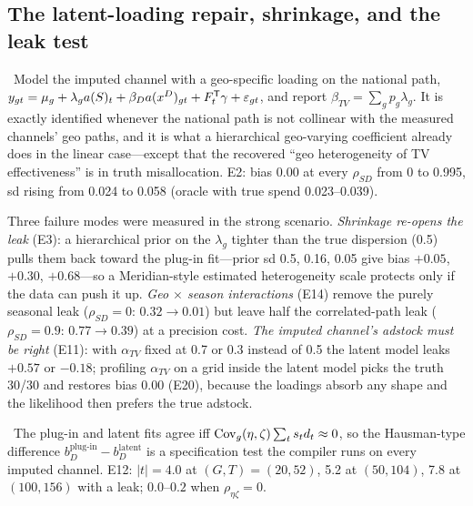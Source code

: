 \subsection{The latent-loading repair, shrinkage, and the leak test}

\begin{proposition}
\label{arch:prop:latent}
\tagEstablished\ Model the imputed channel with a geo-specific loading on the national path, $y_{gt} = \mu_g + \lambda_g a(S)_t + \beta_D a(x^D)_{gt} + F_t^{\mathsf{T}}\gamma + \varepsilon_{gt}$, and report $\beta_{TV} = \sum_g p_g\lambda_g$. It is exactly identified whenever the national path is not collinear with the measured channels' geo paths, and it is what a hierarchical geo-varying coefficient already does in the linear case---except that the recovered ``geo heterogeneity of TV effectiveness'' is in truth misallocation. E2: bias 0.00 at every $\rho_{SD}$ from 0 to 0.995, sd rising from 0.024 to 0.058 (oracle with true spend 0.023--0.039).
\end{proposition}

Three failure modes were measured in the strong scenario. \emph{Shrinkage re-opens the leak} (E3): a hierarchical prior on the $\lambda_g$ tighter than the true dispersion (0.5) pulls them back toward the plug-in fit---prior sd 0.5, 0.16, 0.05 give bias $+0.05$, $+0.30$, $+0.68$---so a Meridian-style estimated heterogeneity scale protects only if the data can push it up. \emph{Geo $\times$ season interactions} (E14) remove the purely seasonal leak ($\rho_{SD} = 0$: $0.32 \to 0.01$) but leave half the correlated-path leak ($\rho_{SD} = 0.9$: $0.77 \to 0.39$) at a precision cost. \emph{The imputed channel's adstock must be right} (E11): with $\alpha_{TV}$ fixed at 0.7 or 0.3 instead of 0.5 the latent model leaks $+0.57$ or $-0.18$; profiling $\alpha_{TV}$ on a grid inside the latent model picks the truth 30/30 and restores bias 0.00 (E20), because the loadings absorb any shape and the likelihood then prefers the true adstock.

\begin{construction}
\label{arch:con:leaktest}
\tagEstablished\ The plug-in and latent fits agree iff $\operatorname{Cov}_g(\eta,\zeta)\sum_t s_td_t \approx 0$, so the Hausman-type difference $b_D^{\mathrm{plug\text{-}in}} - b_D^{\mathrm{latent}}$ is a specification test the compiler runs on every imputed channel. E12: $|t| = 4.0$ at $(G,T) = (20,52)$, 5.2 at $(50,104)$, 7.8 at $(100,156)$ with a leak; $0.0$--$0.2$ when $\rho_{\eta\zeta} = 0$.
\end{construction}

